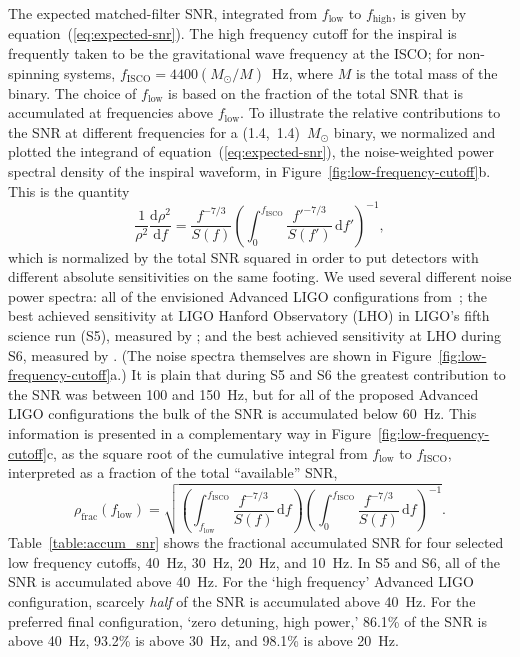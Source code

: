 \documentclass[preprint2]{aastex}
\newcommand{\Msun}{\ensuremath{M_{\odot}}}
\begin{document}
The expected matched-filter SNR, integrated from $f_\mathrm{low}$ to $f_\mathrm{high}$, is given by equation~(\ref{eq:expected-snr}).  The high frequency cutoff for the inspiral is frequently taken to be the gravitational wave frequency at the ISCO; for non-spinning systems, $f_\mathrm{ISCO} = 4400 (\Msun / M)$~Hz, where $M$ is the total mass of the binary.  The choice of $f_\mathrm{low}$ is based on the fraction of the total SNR that is accumulated at frequencies above $f_\mathrm{low}$.  To illustrate the relative contributions to the SNR at different frequencies for a (1.4,~1.4)~$\Msun$ binary, we normalized and plotted the integrand of equation~(\ref{eq:expected-snr}), the noise-weighted power spectral density of the inspiral waveform, in Figure~\ref{fig:low-frequency-cutoff}b.  This is the quantity
%
$$
	\frac{1}{\rho^2}\frac{\mathrm{d}\rho^2}{\mathrm{d}f} = \frac{f^{-7/3}}{S(f)} \left( \int_0^{f_\mathrm{ISCO}} \frac{{f'}^{-7/3}}{S(f')} \, \mathrm{d}f' \right)^{-1},
$$
%
which is normalized by the total SNR squared in order to put detectors with different absolute sensitivities on the same footing.  We used several different noise power spectra: all of the envisioned Advanced LIGO configurations from~\citet{ALIGONoise}; the best achieved sensitivity at LIGO Hanford Observatory (LHO) in LIGO's fifth science run (S5), measured by \citet{S5InspiralRange}; and the best achieved sensitivity at LHO during S6, measured by \citet{S6InspiralRange}.  (The noise spectra themselves are shown in Figure~\ref{fig:low-frequency-cutoff}a.)  It is plain that during S5 and S6 the greatest contribution to the SNR was between 100 and 150~Hz, but for all of the proposed Advanced LIGO configurations the bulk of the SNR is accumulated below 60~Hz.  This information is presented in a complementary way in Figure~\ref{fig:low-frequency-cutoff}c, as the square root of the cumulative integral from $f_\mathrm{low}$ to $f_\mathrm{ISCO}$, interpreted as a fraction of the total ``available'' SNR,
%
$$
	\rho_\mathrm{frac}(f_\mathrm{low}) = \sqrt{\left( \int_{f_\mathrm{low}}^{f_\mathrm{ISCO}} \frac{{f}^{-7/3}}{S(f)} \, \mathrm{d}f \right) \left( \int_0^{f_\mathrm{ISCO}} \frac{{f}^{-7/3}}{S(f)} \, \mathrm{d}f \right)^{-1}}.
$$
%
Table~\ref{table:accum_snr} shows the fractional accumulated SNR for four selected low frequency cutoffs, 40~Hz, 30~Hz, 20~Hz, and 10~Hz.  In S5 and S6, all of the SNR is accumulated above 40~Hz.  For the `high frequency' Advanced LIGO configuration, scarcely \emph{half} of the SNR is accumulated above 40~Hz.  For the preferred final configuration, `zero detuning, high power,' 86.1\% of the SNR is above 40~Hz, 93.2\% is above 30~Hz, and 98.1\% is above 20~Hz.
\end{document}
